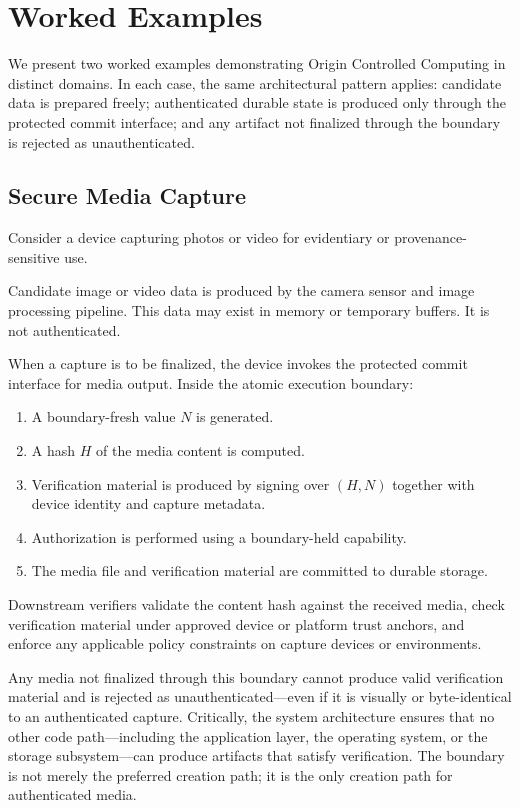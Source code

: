 \documentclass[11pt,letterpaper]{article}
\theoremstyle{occplain}
\theoremstyle{occremark}
\begin{document}
\section{Worked Examples}
\label{sec:examples}

We present two worked examples demonstrating Origin Controlled Computing in distinct domains. In each case, the same architectural pattern applies: candidate data is prepared freely; authenticated durable state is produced only through the protected commit interface; and any artifact not finalized through the boundary is rejected as unauthenticated.


\subsection{Secure Media Capture}
\label{sec:media-capture}

Consider a device capturing photos or video for evidentiary or provenance-sensitive use.

Candidate image or video data is produced by the camera sensor and image processing pipeline. This data may exist in memory or temporary buffers. It is not authenticated.

When a capture is to be finalized, the device invokes the protected commit interface for media output. Inside the atomic execution boundary:
\begin{enumerate}
  \item A boundary-fresh value $N$ is generated.
  \item A hash $H$ of the media content is computed.
  \item Verification material is produced by signing over $(H, N)$ together with device identity and capture metadata.
  \item Authorization is performed using a boundary-held capability.
  \item The media file and verification material are committed to durable storage.
\end{enumerate}

Downstream verifiers validate the content hash against the received media, check verification material under approved device or platform trust anchors, and enforce any applicable policy constraints on capture devices or environments.

Any media not finalized through this boundary cannot produce valid verification material and is rejected as unauthenticated---even if it is visually or byte-identical to an authenticated capture. Critically, the system architecture ensures that no other code path---including the application layer, the operating system, or the storage subsystem---can produce artifacts that satisfy verification. The boundary is not merely the preferred creation path; it is the only creation path for authenticated media.
\end{document}
